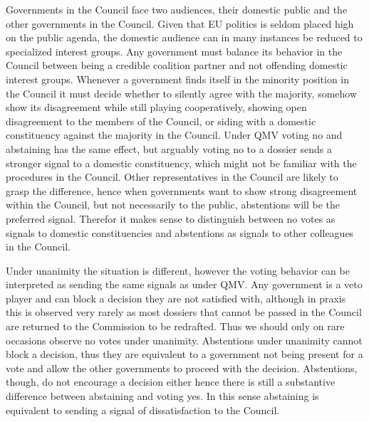 Governments in the Council face two audiences, their domestic public and the other governments in the Council. Given that EU politics is seldom placed high on the public agenda, the domestic audience can in many instances be reduced to specialized interest groups. Any government must balance its behavior in the Council between being a credible coalition partner and not offending domestic interest groups. Whenever a government finds itself in the minority position in the Council it must decide whether to silently agree with the majority, somehow show its disagreement while still playing cooperatively, showing open disagreement to the members of the Council, or siding with a domestic constituency against the majority in the Council. Under QMV voting no and abstaining has the same effect, but arguably voting no to a dossier sends a stronger signal to a domestic constituency, which might not be familiar with the procedures in the Council. Other representatives in the Council are likely to grasp the difference, hence when governments want to show strong disagreement within the Council, but not necessarily to the public, abstentions will be the preferred signal. Therefor it makes sense to distinguish between no votes as signals to domestic constituencies and abstentions as signals to other colleagues in the Council. 

Under unanimity the situation is different, however the voting behavior can be interpreted as sending the same signals as under QMV. Any government is a veto player and can block a decision they are not satisfied with, although in praxis this is observed very rarely as most dossiers that cannot be passed in the Council are returned to the Commission to be redrafted. Thus we should only on rare occasions observe no votes under unanimity. Abstentions under unanimity cannot block a decision, thus they are equivalent to a government not being present for a vote and allow the other governments to proceed with the decision. Abstentions, though, do not encourage a decision either hence there is still a substantive difference between abstaining and voting yes. In this sense abstaining is equivalent to sending a signal of dissatisfaction to the Council. 


